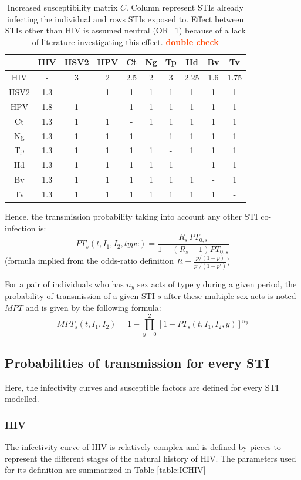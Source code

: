 \documentclass[11pt, onecolumn]{article}
\newcommand{\warning}[1]{\textbf{\textcolor{OrangeRed}{#1}}}
\begin{document}
\begin{table}[htdp]
\begin{center}
\begin{tabular}{|c|c|c|c|c|c|c|c|c|c|}
\hline
&HIV&HSV2&HPV&Ct&Ng&Tp&Hd&Bv&Tv\\
\hline
HIV&-&3&2&2.5&2&3&2.25&1.6&1.75\\
HSV2&1.3&-&1&1&1&1&1&1&1\\
HPV&1.8&1&-&1&1&1&1&1&1\\
Ct&1.3&1&1&-&1&1&1&1&1\\
Ng&1.3&1&1&1&-&1&1&1&1\\
Tp&1.3&1&1&1&1&-&1&1&1\\
Hd&1.3&1&1&1&1&1&-&1&1\\
Bv&1.3&1&1&1&1&1&1&-&1\\
Tv&1.3&1&1&1&1&1&1&1&-\\
\hline
\end{tabular}
\end{center}
\caption{Increased susceptibility matrix $C$. Column represent STIs already infecting the individual and rows STIs exposed to. Effect between STIs other than HIV is assumed neutral (OR=1) because of a lack of literature investigating this effect. \warning{double check}}
\label{default}
\end{table}%

Hence, the transmission probability taking into account any other STI co-infection is:
$$PT_s(t,I_1,I_2,type) =\frac{R_s\,  PT_{0,s} }{1+ (R_s-1)PT_{0,s} }$$
(formula implied from the odds-ratio definition $R=\frac{p/(1-p)}{p'/(1-p')}$)

For a pair of individuals who has $n_{y}$ sex acts of type $y$ during a given period, the probability of transmission of a given STI $s$ after these multiple sex acts is noted $MPT$ and is given by the following formula:
$$ MPT_s(t,I_1,I_2) = 1- \prod_{y=0}^{2}[1-PT_s(t,I_1,I_2,y)]^{n_y} $$


\subsection{Probabilities of transmission for every STI}
\label{sec:probaTransmission}
Here, the infectivity curves and susceptible factors are defined for every STI modelled.

\subsubsection{HIV}
The infectivity curve of HIV is relatively complex and is defined by pieces to represent the different stages of the natural history of HIV. The parameters used for its definition are summarized in Table \ref{table:ICHIV}
\end{document}
